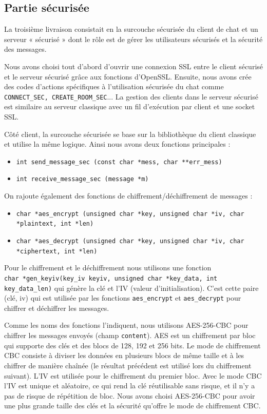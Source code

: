 \documentclass[a4paper,11pt,french]{book}
\begin{document}
\subsection{Partie sécurisée}
La troisième livraison consistait en la surcouche sécurisée du client de chat et un serveur « sécurisé » dont le rôle est de gérer les utilisateurs sécurisés et la sécurité des messages.

Nous avons choisi tout d'abord d'ouvrir une connexion SSL entre le client sécurisé et le serveur sécurisé grâce aux fonctions d'OpenSSL. Ensuite, nous avons crée des codes d'actions spécifiques à l'utilisation sécurisée du chat comme \verb+CONNECT_SEC, CREATE_ROOM_SEC+... La gestion des clients dans le serveur sécurisé est similaire au serveur classique avec un fil d'exécution par client et une socket SSL.

Côté client, la surcouche sécurisée se base sur la bibliothèque du client classique et utilise la même logique. Ainsi nous avons deux fonctions principales : 
\begin{itemize}
\item \verb+int send_message_sec (const char *mess, char **err_mess)+
\item \verb+int receive_message_sec (message *m)+
\end{itemize}

On rajoute également des fonctions de chiffrement/déchiffrement de messages :
\small{
\begin{itemize}
\item \verb+char *aes_encrypt (unsigned char *key, unsigned char *iv, char *plaintext, int *len)+

\item \verb+char *aes_decrypt (unsigned char *key, unsigned char *iv, char *ciphertext, int *len)+
\end{itemize}
}
\large
Pour le chiffrement et le déchiffrement nous utilisons une fonction \\
 \verb+char *gen_keyiv(key_iv keyiv, unsigned char *key_data, int key_data_len)+ 
 qui génère la clé et l'IV (valeur d'initialisation). C'est cette paire (clé, iv) qui est utilisée par les fonctions \verb+aes_encrypt+ et \verb+aes_decrypt+ pour chiffrer et déchiffrer les messages.

Comme les noms des fonctions l'indiquent, nous utilisons AES-256-CBC pour chiffrer les messages envoyés (champ \verb+content+). AES est un chiffrement par bloc qui supporte des clés et des blocs de 128, 192 et 256 bits. Le mode de chiffrement CBC consiste à diviser les données en plusieurs blocs de même taille et à les chiffrer de manière chaînée (le résultat précédent est utilisé lors du chiffrement suivant). L'IV est utilisée pour le chiffrement du premier bloc. Avec le mode CBC l'IV est unique et aléatoire, ce qui rend la clé réutilisable sans risque, et il n'y a pas de risque de répétition de bloc. Nous avons choisi AES-256-CBC pour avoir une plus grande taille des clés et la sécurité qu'offre le mode de chiffrement CBC. 
\end{document}
